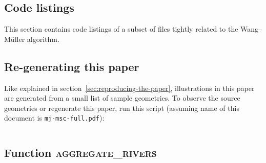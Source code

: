 \documentclass[a4paper]{article}
\newcommand{\inputcode}[2]{\inputminted[fontsize=\small]{#1}{#2}}
\newcommand{\inputcode}[2]{}
\newcommand{\WM}{Wang--M{\"u}ller}
\begin{document}
\begin{appendices}

\section{Code listings}

This section contains code listings of a subset of files tightly related to the
    {\WM} algorithm.

\subsection{Re-generating this paper}
\label{sec:code-regenerate}

Like explained in section~\ref{sec:reproducing-the-paper}, illustrations in
    this paper are generated from a small list of sample geometries. To observe
    the source geometries or regenerate this paper, run this script (assuming
    name of this document is {\tt mj-msc-full.pdf}):

\inputcode{bash}{extract-and-generate}


\subsection{Function \textsc{aggregate\_rivers}}
\inputcode{postgresql}{aggregate-rivers.sql}

\end{appendices}
\end{document}
